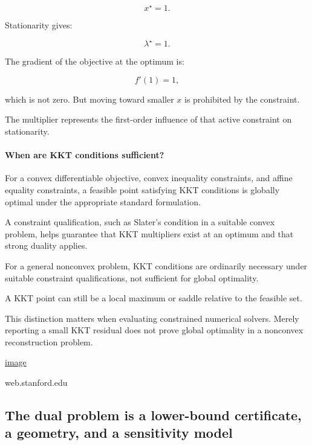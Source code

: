 \[
\boxed{x^\star=1}.
\]

Stationarity gives:

\[
\boxed{\lambda^\star=1}.
\]

The gradient of the objective at the optimum is:

\[
f'(1)=1,
\]

which is not zero. But moving toward smaller \(x\) is prohibited by the constraint.

The multiplier represents the first-order influence of that active constraint on stationarity.

\paragraph{When are KKT conditions sufficient?}\label{02-foundations-ii-ch026-when-are-kkt-conditions-sufficient}

\hypertarget{02-foundations-ii-ch026-when-are-kkt-conditions-sufficient}{}

For a convex differentiable objective, convex inequality constraints, and affine equality constraints, a feasible point satisfying KKT conditions is globally optimal under the appropriate standard formulation.

A constraint qualification, such as Slater's condition in a suitable convex problem, helps guarantee that KKT multipliers exist at an optimum and that strong duality applies.

For a general nonconvex problem, KKT conditions are ordinarily necessary under suitable constraint qualifications, not sufficient for global optimality.

A KKT point can still be a local maximum or saddle relative to the feasible set.

This distinction matters when evaluating constrained numerical solvers. Merely reporting a small KKT residual does not prove global optimality in a nonconvex reconstruction problem. 

\href{https://www.google.com/s2/favicons?domain=https://web.stanford.edu&sz=32}{image}

web.stanford.edu

\subsection{The dual problem is a lower-bound certificate, a geometry, and a sensitivity model}\label{02-foundations-ii-ch026-the-dual-problem-is-a-lower-bound-certificate-a-geometry-and-a-sensitivity-model}

